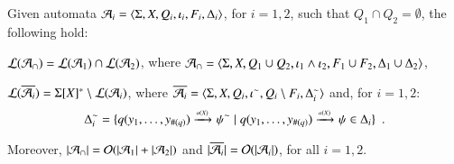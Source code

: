\documentclass{llncs}
\begin{document}
\begin{theorem}\label{thm:closure}
  Given automata $\mathcal{A}_i = \langle \Sigma,X,Q_i,\iota_i,F_i,\Delta_i \rangle$,
  for $i=1,2$, such that $Q_1 \cap Q_2 = \emptyset$, the following hold: 
  \begin{compactenum}
    \item\label{it1:thm:closure} ${\mathcal L}({\mathcal{A}_\cap}) = {\mathcal L}({\mathcal{A}_1}) \cap {\mathcal L}({\mathcal{A}_2})$, where
      $\mathcal{A}_\cap = \langle \Sigma,X,Q_1 \cup Q_2, \iota_1 \wedge \iota_2,
      F_1 \cup F_2, \Delta_1 \cup \Delta_2 \rangle$, 
    \item\label{it2:thm:closure} ${\mathcal L}({\overline{\mathcal{A}_i}}) = \Sigma[X]^*
      \setminus {\mathcal L}({\mathcal{A}_i})$, where $\overline{\mathcal{A}_i} =
      \langle \Sigma,X,Q_i,{\iota}^{\sim},Q_i\setminus
        F_i,{\Delta}^{\sim}_i \rangle$ and, for $i=1,2$: \[{\Delta}^{\sim}_i =
      \{ q(y_1,\ldots,y_{\#(q)}) \xrightarrow{{\scriptscriptstyle a(X)}}_{{\scriptstyle }} {\psi}^{\sim} \mid
        q(y_1,\ldots,y_{\#(q)}) \xrightarrow{{\scriptscriptstyle a(X)}}_{{\scriptstyle }} \psi \in
        \Delta_i \}\enspace.\]
  \end{compactenum}
  Moreover, ${|{\mathcal{A}_\cap}|} = \mathcal{O}({{|{\mathcal{A}_1}|}+{|{\mathcal{A}_2}|}})$ and
  ${|{\overline{\mathcal{A}_i}}|} = \mathcal{O}({{|{\mathcal{A}_i}|}})$, for all $i=1,2$.
\end{theorem}
\end{document}
